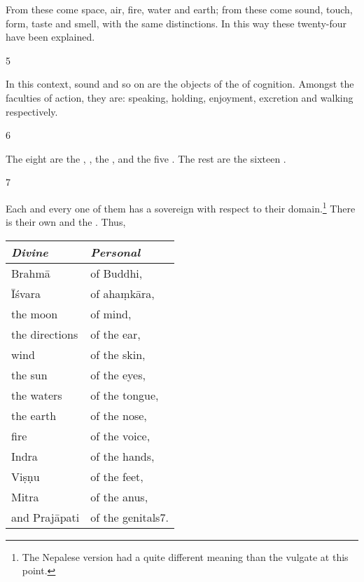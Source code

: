 \begin{translation}
    From these  come space, air, fire, water and earth; 
    from these come sound, touch, form, taste and smell, with the same 
    distinctions.  In this way these twenty-four  have 
    been explained. 
            
\item[5]    

In this context, sound and so on are the objects of the  of 
cognition.  Amongst the faculties of action, they are: speaking, holding, 
enjoyment, excretion and walking respectively.  

\item[6]

The eight  are 
the ,
, 
the , 
and the five .
The rest are the sixteen .
    
\item[7]   

Each and every one of them has a sovereign with respect to their
domain.\footnote{The Nepalese version had a quite different meaning
    than the vulgate at this point.}  There is their own
     and the .
    Thus, \\
\begin{center}
\begin{tabular}{ll}
\toprule
\emph{Divine} & \emph{Personal}\\
\midrule
Brahmā & of Buddhi,\\
Īśvara &of ahaṃkāra,\\
the moon &of mind,\\
the directions &of the ear,\\
wind &of the skin,\\
the sun & of the eyes,\\
the waters &of the tongue,\\
the earth &of the nose,\\
fire &of the voice,\\
Indra & of the hands,\\
Viṣṇu &of the feet,\\
Mitra & of the anus,\\
and Prajāpati &of the genitals7.\\
\bottomrule
\end{tabular}
\end{center}









\end{translation}
